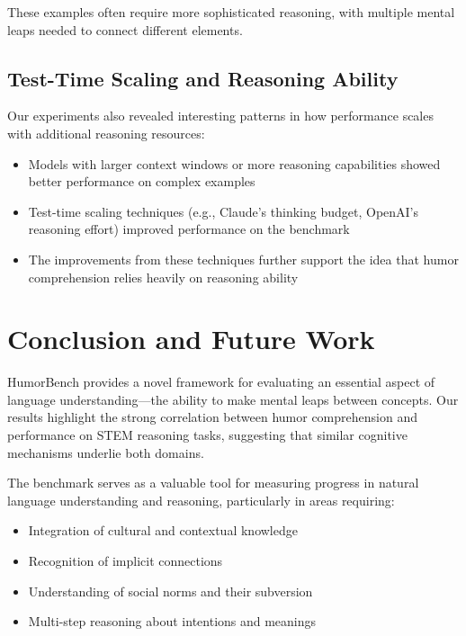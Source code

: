 \documentclass[twocolumn]{article}
\begin{document}
These examples often require more sophisticated reasoning, with multiple mental leaps needed to connect different elements.


\subsection{Test-Time Scaling and Reasoning Ability}

Our experiments also revealed interesting patterns in how performance scales with additional reasoning resources:

\begin{itemize}
    \item Models with larger context windows or more reasoning capabilities showed better performance on complex examples
    \item Test-time scaling techniques (e.g., Claude's thinking budget, OpenAI's reasoning effort) improved performance on the benchmark
    \item The improvements from these techniques further support the idea that humor comprehension relies heavily on reasoning ability
\end{itemize}


\section{Conclusion and Future Work}

HumorBench provides a novel framework for evaluating an essential aspect of language understanding—the ability to make mental leaps between concepts. Our results highlight the strong correlation between humor comprehension and performance on STEM reasoning tasks, suggesting that similar cognitive mechanisms underlie both domains.

The benchmark serves as a valuable tool for measuring progress in natural language understanding and reasoning, particularly in areas requiring:
\begin{itemize}
    \item Integration of cultural and contextual knowledge
    \item Recognition of implicit connections
    \item Understanding of social norms and their subversion
    \item Multi-step reasoning about intentions and meanings
\end{itemize}
\end{document}
